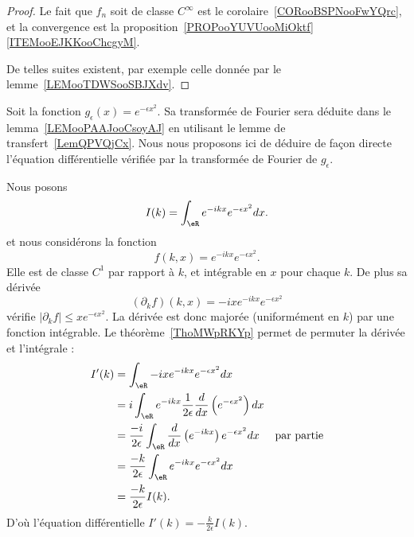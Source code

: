 \begin{proof}
	Le fait que \( f_n\) soit de classe \(  C^{\infty}\) est le corolaire~\ref{CORooBSPNooFwYQrc}, et la convergence est la proposition~\ref{PROPooYUVUooMiOktf}\ref{ITEMooEJKKooChcgyM}.

	De telles suites existent, par exemple celle donnée par le lemme~\ref{LEMooTDWSooSBJXdv}.
\end{proof}

\begin{example} \label{EXooLMXKooFcAZGR}
	Soit la fonction \( g_{\epsilon}(x)= e^{-\epsilon x^2}\). Sa transformée de Fourier sera déduite dans le lemma~\ref{LEMooPAAJooCsoyAJ} en utilisant le lemme de transfert~\ref{LemQPVQjCx}. Nous nous proposons ici de déduire de façon directe l'équation différentielle vérifiée par la transformée de Fourier de \( g_{\epsilon}\).

	Nous posons
	\begin{equation}
		I(k)=\int_{\eR} e^{-ikx} e^{-\epsilon x^2}dx.
	\end{equation}
	et nous considérons la fonction
	\begin{equation}
		f(k,x)= e^{-ikx} e^{-\epsilon x^2}.
	\end{equation}
	Elle est de classe \( C^1\) par rapport à \( k\), et intégrable en \( x\) pour chaque \( k\). De plus sa dérivée
	\begin{equation}
		(\partial_k f)(k,x)=-ix e^{-ikx} e^{-\epsilon x^2}
	\end{equation}
	vérifie \( | \partial_kf |\leq x e^{-\epsilon x^2}\). La dérivée est donc majorée (uniformément en \( k\)) par une fonction intégrable. Le théorème~\ref{ThoMWpRKYp} permet de permuter la dérivée et l'intégrale :
	\begin{subequations}
		\begin{align}
			I'(k) & =\int_{\eR}-ix e^{-ikx} e^{-\epsilon x^2}dx                                                                         \\
			      & =i\int_{\eR} e^{-ikx}\frac{1}{ 2\epsilon } \frac{ d  }{ dx }\left(  e^{-\epsilon x^2} \right)dx                     \\
			      & =\frac{ -i }{ 2\epsilon }\int_{\eR}\frac{ d }{ dx }\left(  e^{-ikx} \right) e^{-\epsilon x^2}dx & \text{par partie} \\
			      & =\frac{ -k }{ 2\epsilon }\int_{\eR} e^{-ikx} e^{-\epsilon x^2}dx                                                    \\
			      & =\frac{ -k }{ 2\epsilon }I(k).
		\end{align}
	\end{subequations}
	D'où l'équation différentielle \( I'(k)=-\frac{ k }{ 2\epsilon }I(k)\).
\end{example}

